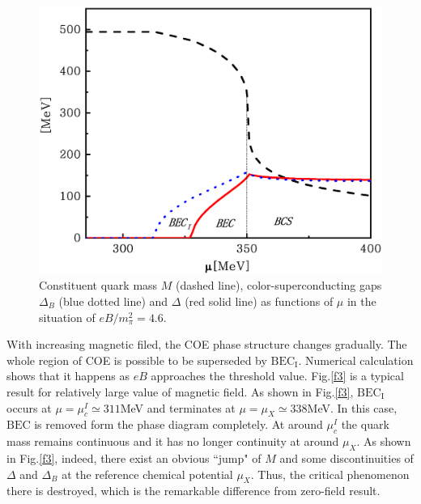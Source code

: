 \documentclass[prd, showpacs,nofootinbib,amsmath,amssymb,12pt]{revtex4}
\begin{document}
\begin{figure}[ht]
	\centering
	\includegraphics[scale=0.3]{1.eps}
	\caption{Constituent quark mass $M$ (dashed line), color-superconducting gaps $\Delta_B$ (blue dotted line) and $\Delta$ (red solid line) as functions of $\mu$ in the situation of $eB/m^2_\pi=4.6$.}
	\label{f2}
\end{figure}


With increasing magnetic filed, the COE phase structure changes gradually.
The whole region of COE is possible to be superseded by $\text{BEC}_\text{I}$. 
Numerical calculation shows that it happens as $eB$ approaches the threshold value.
Fig.\ref{f3} is a typical result for relatively large value of magnetic field. As shown in Fig.\ref{f3},
$\text{BEC}_\text{I}$ occurs at $\mu= \mu_c^I \simeq311$MeV and terminates at $\mu= \mu_X\simeq338$MeV.
In this case, $\text{BEC}$ is removed form the phase diagram completely. 
At around $\mu_c^I$ the quark mass remains continuous and it has no longer continuity at around $\mu_X$. As shown in Fig.\ref{f3}, indeed, there exist an obvious ``jump" of $M$ and some discontinuities of $\Delta$ and $\Delta_B$ at the reference chemical potential $\mu_X$. Thus, the critical phenomenon there is destroyed, which is the remarkable difference from zero-field result. 
\end{document}
